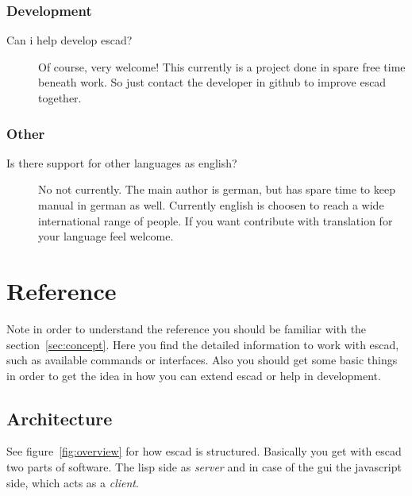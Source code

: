 \documentclass[a4paper, 12pt, openany]{scrbook}
\begin{document}
\subsection{Development}
\begin{description}
\item[Can i help develop escad?] Of course, very welcome! This currently is a project done in spare free time beneath work. So just contact the developer in github to improve escad together.
\end{description}
\subsection{Other}
\begin{description}
\item[Is there support for other languages as english?]  No not currently. The main author is german, but has spare time to keep manual in german as well. Currently english is choosen to reach a wide international range of people. If you want contribute with translation for your language feel welcome.
\end{description}
\chapter{Reference}
Note in order to understand the reference you should be familiar with the section~\ref{sec:concept}. Here you find the detailed information to work with escad, such as available commands or interfaces. Also you should get some basic things in order to get the idea in how you can extend escad or help in development.
\section{Architecture}
See figure~\ref{fig:overview} for how escad is structured. Basically you get with escad two parts of software. The lisp side as \emph{server} and in case of the gui the javascript side, which acts as a \emph{client}.
\end{document}
